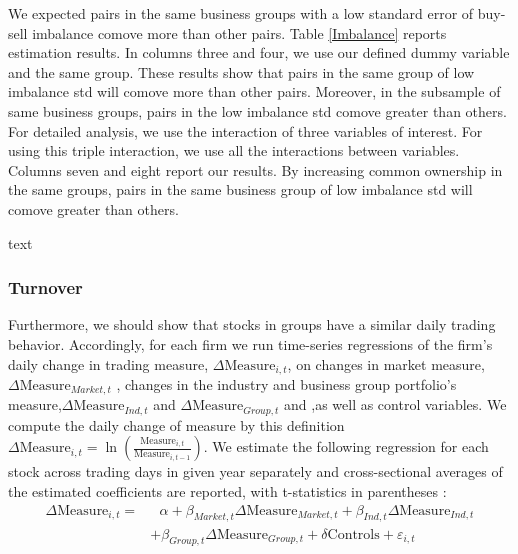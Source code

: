 \documentclass[12pt, a4paper]{article}
\begin{document}
We expected pairs in the same business groups with a low standard error of buy-sell imbalance comove more than other pairs. Table \ref{Imbalance} reports estimation results. In columns three and four, we use our defined dummy variable and the same group. These results show that pairs in the same group of low imbalance std will comove more than other pairs. Moreover, in the subsample of same business groups, pairs in the low imbalance std comove greater than others.  For detailed analysis, we use the interaction of three variables of interest. For using this triple interaction, we use all the interactions between variables. Columns seven and eight report our results. By increasing common ownership in the same groups, pairs in the same business group of low imbalance std will comove greater than others.
\begin{table}[htbp]
	\centering
	\caption{text}
	\label{Imbalance}
	\resizebox{\textwidth}{!}{
		
	}
\end{table}
\FloatBarrier

 \subsubsection{Turnover}

Furthermore, we should show that stocks in groups have a similar daily trading behavior. Accordingly, for each firm we run time-series regressions of the firm's daily change in trading measure, $ \Delta \text{Measure}_{i,t} $, on changes in market measure,$ \Delta\text{Measure}_{Market,t}   $ , changes in the industry and business group portfolio's measure,$ \Delta\text{Measure}_{Ind,t} $ and  $\Delta \text{Measure}_{Group,t} $ and  ,as well as control variables.
We compute the daily change of measure by this definition $ \Delta \text{Measure}_{i,t} = \ln(\frac{\text{Measure}_{i,t}}{\text{Measure}_{i,t-1}}) $. 
We estimate the following regression for each stock across trading days in given year separately and cross-sectional averages of the estimated coefficients are reported, with t-statistics in parentheses :
\begin{equation*}
	\begin{split}
		\Delta \text{Measure}_{i,t} =  & \text{	}\alpha + \beta_{Market,t} \Delta \text{Measure}_{Market,t}  
		+ \beta_{Ind,t} \Delta \text{Measure}_{Ind,t} \\ & + \beta_{Group,t} \Delta \text{Measure}_{Group,t} + \delta\text{Controls} + \varepsilon_{i,t}
	\end{split}
\end{equation*}
\end{document}
